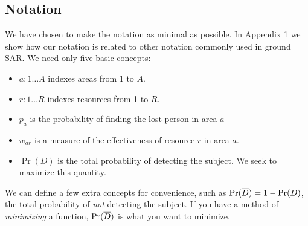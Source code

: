 \subsection{Notation}

We have chosen to make the notation as minimal as possible. In
Appendix 1 we show how our notation is related to other notation
commonly used in ground SAR. We need only five basic concepts:
\begin{itemize}
\item $a: 1\ldots A$ indexes areas from 1 to $A$.
\item $r: 1\ldots R$ indexes resources from 1 to $R$.
\item $p_a$ is the probability of finding the lost person in area $a$
\item $w_{ar}$ is a measure of the effectiveness of resource $r$ in
  area $a$.
\item $\Pr(D)$ is the total probability of detecting the subject. We
  seek to maximize this quantity.
\end{itemize}
We can define a few extra concepts for convenience, such as
$\Pr(\overline{D}) = 1 - \Pr(D)$, the total probability of \emph{not}
detecting the subject. If you have a method of \emph{minimizing} a
function, $\Pr(\overline{D})$ is what you want to minimize.


